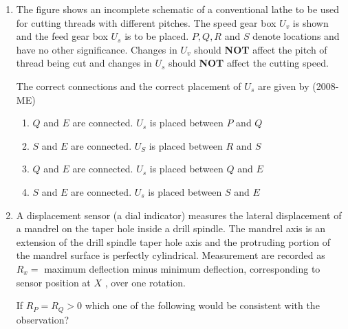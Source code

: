 \documentclass[journal]{IEEEtran}
\begin{document}
\begin{enumerate}
    \item The figure shows an incomplete schematic of a conventional lathe to be used for cutting threads with different pitches. The speed gear box $U_v$
 is shown and the feed gear box $U_s$
 is to be placed. $P, Q, R$
 and $S$
 denote locations and have no other significance. Changes in $U_v$
 should \textbf{NOT}
 affect the pitch of thread being cut and changes in $U_s$
 should \textbf{NOT} affect the cutting speed. 
 
 The correct connections and the correct placement of $U_s$
 are given by \hfill(2008-ME)
 \begin{enumerate}
         \item $Q$ and $E$ are connected. $U_s$ is placed between $P$ and $Q$
         \item $S$ and $E$ are connected. $U_S$ is placed between $R$ and $S$
         \item $Q$ and $E$ are connected. $U_s$ is placed between $Q$ and $E$
         \item $S$ and $E$ are connected. $U_s$ is placed between $S$ and $E$
 \end{enumerate}
 \item A displacement sensor (a dial indicator) measures the lateral displacement of a mandrel on the taper hole inside a drill spindle. The mandrel axis is an extension of the drill spindle taper hole axis and the protruding portion of the mandrel surface is perfectly cylindrical. Measurement are recorded as $R_x = $
 maximum deflection minus minimum deflection, corresponding to sensor position at $X$
, over one rotation.

If $R_P = R_Q > 0$
 which one of the following would be consistent with the observation? 


\end{enumerate}
\end{document}
